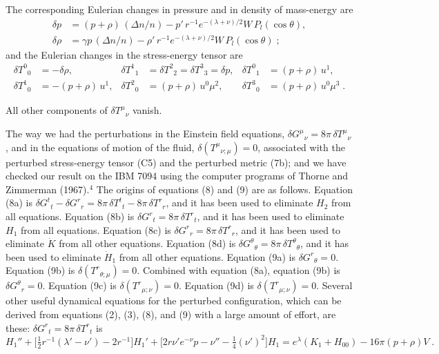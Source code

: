 \documentclass[12pt]{article}
\begin{document}
The corresponding Eulerian changes in pressure and in density of mass-energy are
\begin{align}
\delta p &= (p+\rho)\,(\Delta n/n) - p'\,r^{-1}e^{-(\lambda+\nu)/2}W\,P_{l}(\cos\theta) ,
\nonumber\\
\delta\rho &= \gamma p\,(\Delta n/n) - \rho'\,r^{-1}e^{-(\lambda+\nu)/2}W\,P_{l}(\cos\theta) \;;
\tag{C4}
\end{align}
and the Eulerian changes in the stress-energy tensor are
\begin{align}
\delta T^{0}{}_{0} &= -\delta\rho , &
\delta T^{1}{}_{1} &= \delta T^{2}{}_{2} = \delta T^{3}{}_{3} = \delta p , &
\delta T^{0}{}_{1} &= (p+\rho)\,u^{1} ,
\nonumber\\
\delta T^{1}{}_{0} &= -(p+\rho)\,u^{1} , &
\delta T^{2}{}_{0} &= (p+\rho)\,u^{0}\mu^{2} , &
\delta T^{3}{}_{0} &= (p+\rho)\,u^{0}\mu^{3} \;.
\tag{C5}
\end{align}

All other components of $\delta T^{\mu}{}_{\nu}$ vanish.

The way we had the perturbations in the Einstein field equations,
$\delta G^{\mu}{}_{\nu} = 8\pi\,\delta T^{\mu}{}_{\nu}$,
and in the equations of motion of the fluid,
$\delta(T^{\mu}{}_{\nu;\mu}) = 0$, associated with the perturbed
stress-energy tensor (C5) and the perturbed metric (7b); and we have checked our result on the
IBM 7094 using the computer programs of Thorne and Zimmerman (1967).$^{4}$
The origins of equations (8) and (9) are as follows.
Equation (8a) is $\delta G^{t}{}_{t} - \delta G^{r}{}_{r} = 8\pi\,\delta T^{t}{}_{t} - 8\pi\,\delta T^{r}{}_{r}$,
and it has been used to eliminate $H_{2}$ from all equations.
Equation (8b) is $\delta G^{r}{}_{t} = 8\pi\,\delta T^{r}{}_{t}$,
and it has been used to eliminate $H_{1}$ from all equations.
Equation (8c) is $\delta G^{r}{}_{r} = 8\pi\,\delta T^{r}{}_{r}$,
and it has been used to eliminate $\dot{K}$ from all other equations.
Equation (8d) is $\delta G^{\theta}{}_{\theta} = 8\pi\,\delta T^{\theta}{}_{\theta}$,
and it has been used to eliminate $\dot{H}_{1}$ from all other equations.
Equation (9a) is $\delta G^{r}{}_{\theta} = 0$.
Equation (9b) is $\delta(T^{r}{}_{\theta;\mu}) = 0$.
Combined with equation (8a), equation (9b) is $\delta G^{\theta}{}_{r} = 0$.
Equation (9c) is $\delta(T^{r}{}_{\mu;\nu}) = 0$.
Equation (9d) is $\delta(T^{r}{}_{\mu;\nu}) = 0$.
Several other useful dynamical equations for the perturbed configuration, which can be
derived from equations (2), (3), (8), and (9) with a large amount of effort, are these:
$\delta G^{r}{}_{t} = 8\pi\,\delta T^{r}{}_{t}$ is
\begin{equation}
H_{1}'' + \bigl[\tfrac{1}{2}r^{-1}(\lambda' - \nu') - 2r^{-1}\bigr]H_{1}'
  + \bigl[2r\nu' e^{-\nu} p - \nu'' - \tfrac{1}{4}(\nu')^{2}\bigr]H_{1}
  = e^{\lambda}(K_{1} + H_{00}) - 16\pi(p+\rho)V \;.
\tag{C6}
\end{equation}
\end{document}
